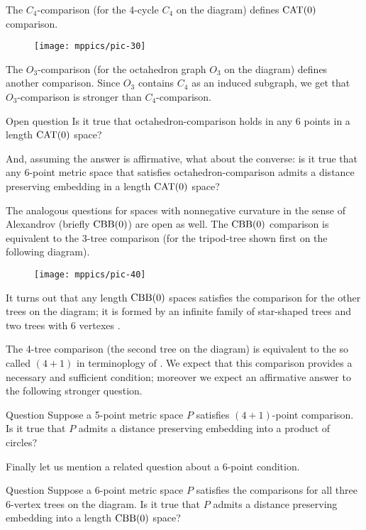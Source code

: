 \documentclass{article}
\begin{document}
The $C_4$-comparison (for the 4-cycle $C_4$ on the diagram) defines $\mathrm{CAT}(0)$ comparison.
\begin{figure}[h!]
\vskip-0mm
\centering
\texttt{[image: mppics/pic-30]}
\end{figure}
The $O_3$-comparison (for the octahedron graph $O_3$ on the diagram) defines another comparison.
Since $O_3$ contains $C_4$ as an induced subgraph, we get that $O_3$-comparison is stronger than $C_4$-comparison.

\begin{thm}{Open question}
Is it true that octahedron-comparison holds in any 6 points in a length $\mathrm{CAT}(0)$ space?

And, assuming the answer is affirmative, what about the converse: is it true that any 6-point metric space that satisfies octahedron-comparison admits a distance preserving embedding in a length $\mathrm{CAT}(0)$ space?
\end{thm}


The analogous questions for  spaces with nonnegative curvature in the sense of Alexandrov (briefly $\mathrm{CBB}(0)$) are open as well.
The $\mathrm{CBB}(0)$ comparison is equivalent to the $3$-tree comparison (for the tripod-tree shown first on the following diagram).
\begin{figure}[h!]
\vskip-0mm
\centering
\texttt{[image: mppics/pic-40]}
\end{figure}
It turns out that any length $\mathrm{CBB}(0)$ spaces satisfies the comparison for the other trees on the diagram; it is formed by an infinite family of star-shaped trees and two trees with 6 vertexes \cite{alexander-kapovitch-petrunin-2011,lebedeva-petrunin-zolotov}.

The 4-tree comparison (the second tree on the diagram) is equivalent to the so called $(4{+}1)$ in terminoplogy of \cite{alexander-kapovitch-petrunin-2011}.
We expect that this comparison provides a necessary and sufficient condition; moreover we expect an affirmative answer to the following stronger question.


\begin{thm}{Question}
Suppose a 5-point metric space $P$ satisfies $(4{+}1)$-point comparison.
Is it true that $P$ admits a distance preserving embedding into a product of circles?
\end{thm}

Finally let us mention a related question about a 6-point condition. 

\begin{thm}{Question}
Suppose a 6-point metric space $P$ satisfies the comparisons for all three 6-vertex trees on the diagram.
Is it true that $P$ admits a distance preserving embedding into a length $\mathrm{CBB}(0)$ space?
\end{thm}

{\sloppy
\printbibliography[heading=bibintoc]
\fussy
}
\end{document}
